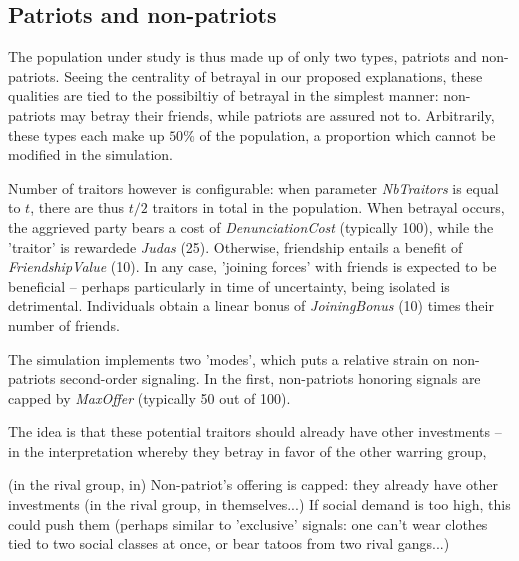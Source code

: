\documentclass[a4paper,12pt]{report}
\begin{document}
\subsection{Patriots and non-patriots}
\label{s:pat_np}

The population under study is thus made up of only two types, patriots and non-patriots.
Seeing the centrality of betrayal in our proposed explanations, these qualities 
are tied to the possibiltiy of betrayal in the simplest manner:
non-patriots may betray their friends, while patriots are assured not to.
Arbitrarily, these types each make up $50\%$ of the population, a proportion which
cannot be modified in the simulation.

Number of traitors however is configurable: when parameter \emph{NbTraitors} is equal
to $t$, there are thus $t/2$ traitors in total in the population. When betrayal
occurs, the aggrieved party bears a cost of \emph{DenunciationCost} (typically 100),
while the 'traitor' is rewardede \emph{Judas} (25).
Otherwise, friendship entails a benefit of \emph{FriendshipValue} (10). In any case,
'joining forces' with friends is expected to be beneficial – perhaps particularly 
in time of uncertainty, being isolated is detrimental. Individuals obtain a linear
bonus of \emph{JoiningBonus} (10) times their number of friends.

The simulation implements two 'modes', which puts a relative strain on 
non-patriots second-order signaling. 
In the first, non-patriots honoring signals are capped by \emph{MaxOffer} 
(typically 50 out of 100).

The idea is that these potential traitors should already have other investments
– in the interpretation whereby they betray in favor of the other warring group,

(in the rival group, in)
Non-patriot's offering is capped: 
they already have other investments (in the rival group, in themselves...)
If social demand is too high, this could push them (perhaps similar to 'exclusive' signals: 
one can't wear clothes tied to two social classes at once,
or bear tatoos from two rival gangs...)
\end{document}

